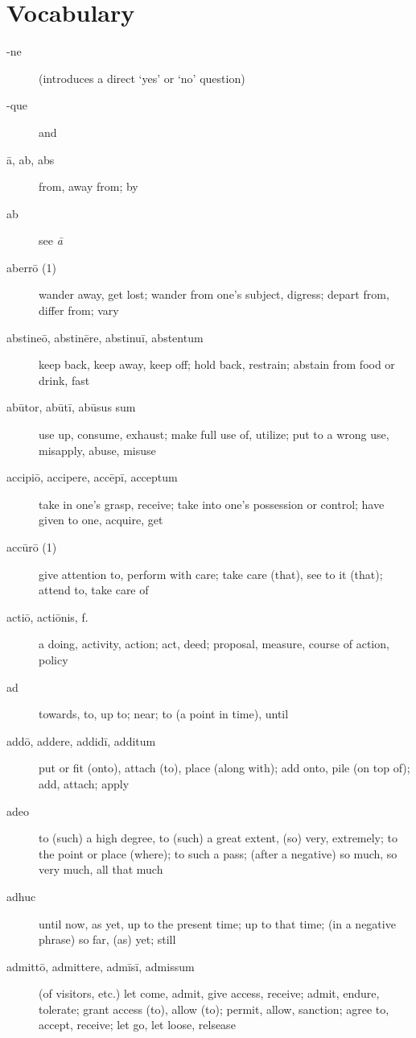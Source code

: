 \chapter{Vocabulary}

\begin{description}
    \item[-ne] (introduces a direct `yes' or `no' question)
    \item[-que] and
    \item[ā, ab, abs] from, away from; by
    \item[ab] see \textit{ā}
    \item[aberrō (1)] wander away, get lost; wander from one's subject, digress; depart from, differ from; vary
    \item[abstineō, abstinēre, abstinuī, abstentum] keep back, keep away, keep off; hold back, restrain; abstain from food or drink, fast
    \item[abūtor, abūtī, abūsus sum]  use up, consume, exhaust; make full use of, utilize; put to a wrong use, misapply, abuse, misuse
    \item[accipiō, accipere, accēpī, acceptum] take in one's grasp, receive; take into one's possession or control; have given to one, acquire, get
    \item[accūrō (1)] give attention to, perform with care; take care (that), see to it (that); attend to, take care of
    \item[actiō, actiōnis, f.] a doing, activity, action; act, deed; proposal, measure, course of action, policy
    \item[ad] towards, to, up to; near; to (a point in time), until
    \item[addō, addere, addidī, additum] put or fit (onto), attach (to), place (along with); add onto, pile (on top of); add, attach; apply
    \item[adeo]  to (such) a high degree, to (such) a great extent, (so) very, extremely; to the point or place (where); to such a pass; (after a negative) so much, so very much, all that much
    \item[adhuc]  until now, as yet, up to the present time; up to that time; (in a negative phrase) so far, (as) yet; still
    \item[admittō, admittere, admīsī, admissum] (of visitors, etc.) let come, admit, give access, receive; admit, endure, tolerate; grant access (to), allow (to); permit, allow, sanction; agree to, accept, receive; let go, let loose, relsease

\end{description}
